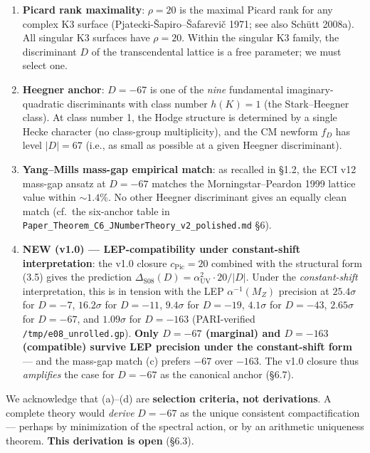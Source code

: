 \documentclass[
  11pt,
  a4paper,
]{article}
\begin{document}
\begin{enumerate}
\def\labelenumi{(\alph{enumi})}
\item
  \textbf{Picard rank maximality}: \(\rho = 20\) is the maximal Picard rank for any complex K3 surface (Pjatecki-Šapiro--Šafarevič 1971; see also Schütt 2008a). All singular K3 surfaces have \(\rho = 20\). Within the singular K3 family, the discriminant \(D\) of the transcendental lattice is a free parameter; we must select one.
\item
  \textbf{Heegner anchor}: \(D = -67\) is one of the \emph{nine} fundamental imaginary-quadratic discriminants with class number \(h(K) = 1\) (the Stark--Heegner class). At class number 1, the Hodge structure is determined by a single Hecke character (no class-group multiplicity), and the CM newform \(f_D\) has level \(|D| = 67\) (i.e., as small as possible at a given Heegner discriminant).
\item
  \textbf{Yang--Mills mass-gap empirical match}: as recalled in §1.2, the ECI v12 mass-gap ansatz at \(D = -67\) matches the Morningstar--Peardon 1999 lattice value within \(\sim 1.4\%\). No other Heegner discriminant gives an equally clean match (cf.~the six-anchor table in \texttt{Paper\_Theorem\_C6\_JNumberTheory\_v2\_polished.md} §6).
\item
  \textbf{NEW (v1.0) --- LEP-compatibility under constant-shift interpretation}: the v1.0 closure \(c_{\mathrm{Pic}} = 20\) combined with the structural form (3.5) gives the prediction \(\Delta_{\mathrm{S08}}(D) = \alpha_{\mathrm{UV}}^2 \cdot 20 / |D|\). Under the \emph{constant-shift} interpretation, this is in tension with the LEP \(\alpha^{-1}(M_Z)\) precision at \(25.4\sigma\) for \(D = -7\), \(16.2\sigma\) for \(D = -11\), \(9.4\sigma\) for \(D = -19\), \(4.1\sigma\) for \(D = -43\), \(2.65\sigma\) for \(D = -67\), and \(1.09\sigma\) for \(D = -163\) (PARI-verified \texttt{/tmp/e08\_unrolled.gp}). \textbf{Only \(D = -67\) (marginal) and \(D = -163\) (compatible) survive LEP precision under the constant-shift form} --- and the mass-gap match (c) prefers \(-67\) over \(-163\). The v1.0 closure thus \emph{amplifies} the case for \(D = -67\) as the canonical anchor (§6.7).
\end{enumerate}

We acknowledge that (a)--(d) are \textbf{selection criteria, not derivations}. A complete theory would \emph{derive} \(D = -67\) as the unique consistent compactification --- perhaps by minimization of the spectral action, or by an arithmetic uniqueness theorem. \textbf{This derivation is open} (§6.3).
\end{document}

